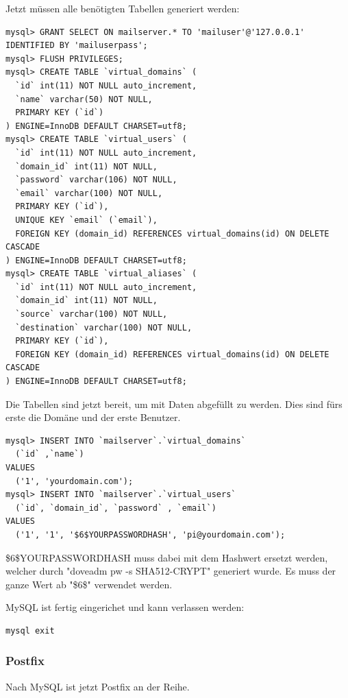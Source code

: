 Jetzt müssen alle benötigten Tabellen generiert werden:

\begin{lstlisting}
mysql> GRANT SELECT ON mailserver.* TO 'mailuser'@'127.0.0.1' IDENTIFIED BY 'mailuserpass';
mysql> FLUSH PRIVILEGES;
mysql> CREATE TABLE `virtual_domains` (
  `id` int(11) NOT NULL auto_increment,
  `name` varchar(50) NOT NULL,
  PRIMARY KEY (`id`)
) ENGINE=InnoDB DEFAULT CHARSET=utf8;
mysql> CREATE TABLE `virtual_users` (
  `id` int(11) NOT NULL auto_increment,
  `domain_id` int(11) NOT NULL,
  `password` varchar(106) NOT NULL,
  `email` varchar(100) NOT NULL,
  PRIMARY KEY (`id`),
  UNIQUE KEY `email` (`email`),
  FOREIGN KEY (domain_id) REFERENCES virtual_domains(id) ON DELETE CASCADE
) ENGINE=InnoDB DEFAULT CHARSET=utf8;
mysql> CREATE TABLE `virtual_aliases` (
  `id` int(11) NOT NULL auto_increment,
  `domain_id` int(11) NOT NULL,
  `source` varchar(100) NOT NULL,
  `destination` varchar(100) NOT NULL,
  PRIMARY KEY (`id`),
  FOREIGN KEY (domain_id) REFERENCES virtual_domains(id) ON DELETE CASCADE
) ENGINE=InnoDB DEFAULT CHARSET=utf8;
\end{lstlisting}

Die Tabellen sind jetzt bereit, um mit Daten abgefüllt zu werden. Dies sind fürs erste die Domäne und der erste Benutzer.

\begin{lstlisting}
mysql> INSERT INTO `mailserver`.`virtual_domains`
  (`id` ,`name`)
VALUES
  ('1', 'yourdomain.com');
mysql> INSERT INTO `mailserver`.`virtual_users`
  (`id`, `domain_id`, `password` , `email`)
VALUES
  ('1', '1', '$6$YOURPASSWORDHASH', 'pi@yourdomain.com');
\end{lstlisting}


\$6\$YOURPASSWORDHASH muss dabei mit dem Hashwert ersetzt werden, welcher durch "doveadm pw -s SHA512-CRYPT" generiert wurde. Es muss der ganze Wert ab "\$6\$" verwendet werden.

MySQL ist fertig eingerichet und kann verlassen werden:

\begin{lstlisting}
mysql exit
\end{lstlisting}

\subsubsection{Postfix}
Nach MySQL ist jetzt Postfix an der Reihe.

